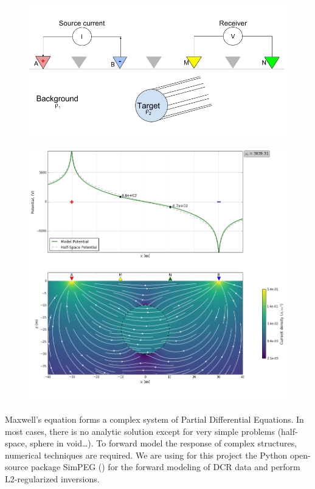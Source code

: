 \documentclass[twoside]{article}
\begin{document}
\begin{figure}[!ht]
\centering
\begin{minipage}{0.5\textwidth}
  \centering
    \includegraphics[width=.9\linewidth]{figures/DCR_Setup_Cylinder.png}
  \label{DC_setup}
\end{minipage}%
\begin{minipage}{.5\textwidth}
  \centering
  \includegraphics[width=.9\linewidth]{figures/DC_survey.png}
  \label{DC_pot_fields}
\end{minipage}
\end{figure}

\newpage
Maxwell's equation forms a complex system of Partial Differential Equations. In most cases, there is no analytic solution except for very simple problems (half-space, sphere in void…). To forward model the response of complex structures, numerical techniques are required. We are using for this project the Python open-source package SimPEG (\cite{CKH+:2015}) for the forward modeling of DCR data and perform L2-regularized inversions.
\end{document}
